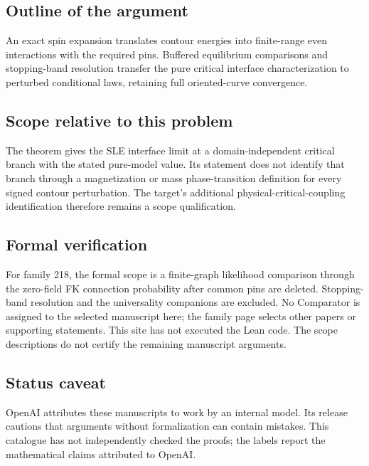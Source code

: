\documentclass[11pt]{article}
\begin{document}
\subsection{Outline of the argument}
An exact spin expansion translates contour energies into finite-range even interactions with the required pins. Buffered equilibrium comparisons and stopping-band resolution transfer the pure critical interface characterization to perturbed conditional laws, retaining full oriented-curve convergence.

\subsection{Scope relative to this problem}
The theorem gives the SLE interface limit at a domain-independent critical branch with the stated pure-model value. Its statement does not identify that branch through a magnetization or mass phase-transition definition for every signed contour perturbation. The target's additional physical-critical-coupling identification therefore remains a scope qualification.

\subsection{Formal verification}
For family 218, the formal scope is a finite-graph likelihood comparison through the zero-field FK connection probability after common pins are deleted. Stopping-band resolution and the universality companions are excluded. No Comparator is assigned to the selected manuscript here; the family page selects other papers or supporting statements. This site has not executed the Lean code. The scope descriptions do not certify the remaining manuscript arguments.

\subsection{Status caveat}
OpenAI attributes these manuscripts to work by an internal model. Its release cautions that arguments without formalization can contain mistakes. This catalogue has not independently checked the proofs; the labels report the mathematical claims attributed to OpenAI.
\end{document}
